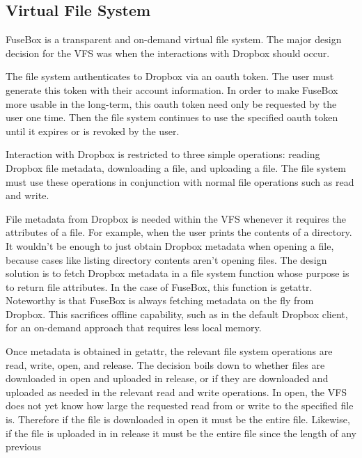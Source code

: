 \documentclass[11pt,twocolumn,letterpaper]{article}
\newcommand{\appname}{FuseBox }
\newcommand{\appnameWOspace}{FuseBox}
\begin{document}
\subsection{Virtual File System}
\label{sec:fs}
\appname is a transparent and on-demand virtual file system. The major design
decision for the VFS was when the interactions with Dropbox should
occur. 
\par The file system authenticates to Dropbox via an oauth token. The user must
generate this token with their account information. In order to make
\appname more usable in the long-term, this oauth token need only be
requested by the user one time. Then the file system continues to
use the specified oauth token until it expires or is
revoked by the user. 
\par Interaction with Dropbox is restricted to three simple
operations: reading Dropbox file metadata, downloading a file, 
and uploading a file. The file system must use these operations in
conjunction with normal file operations such as read and write. 
\par File metadata from Dropbox is needed within the VFS whenever it
requires the attributes of a file. For example, when the user prints
the contents of a directory. It wouldn't be enough to just obtain Dropbox
metadata when opening a file, because cases like listing directory contents
aren't opening files. The design solution is to fetch Dropbox metadata
in a file system function whose purpose is to return file
attributes. In the case of \appnameWOspace, this function is getattr. 
Noteworthy is that \appname is always fetching metadata on the fly
from Dropbox. This sacrifices offline capability, such as in the
default Dropbox client, for an on-demand approach that requires less
local memory. 
\par Once metadata is obtained in getattr, the relevant file system 
operations are read, write, open, and
release. The decision boils down to whether files are downloaded in open and
uploaded in release, or if they are downloaded and uploaded as needed
in the relevant read and write operations.
In open, the VFS does not yet know how large the requested read from or
write to the specified file is. Therefore if the file is downloaded in
open it must be the entire file. Likewise, if the file is uploaded in
in release it must be the entire file since the length of any previous
\end{document}
